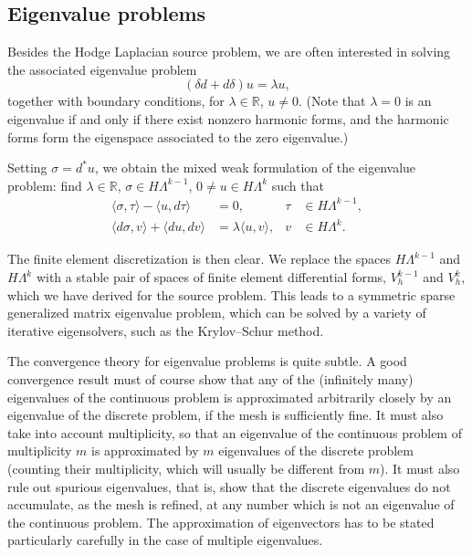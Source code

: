 \subsection{{Eigenvalue problems}}\label{sec:eigenvalue-problems}

{Besides the Hodge Laplacian source problem, we are often interested in solving the associated eigenvalue problem}
\[
(\delta d+d\delta)u=\lambda u,
\]
{together with boundary conditions, for $\lambda\in\mathbb R$, $u\neq0$. (Note that $\lambda=0$ is an eigenvalue if and only if there exist nonzero harmonic forms, and the harmonic forms form the eigenspace associated to the zero eigenvalue.)}

{Setting $\sigma=d^*u$, we obtain the mixed weak formulation of the eigenvalue problem: find $\lambda\in\mathbb R$, $\sigma\in H\Lambda^{k-1}$, $0\neq u\in H\Lambda^k$ such that}
\[
\begin{aligned}
\langle\sigma,\tau\rangle-\langle u,d\tau\rangle&=0,&\tau&\in H\Lambda^{k-1},\\
\langle d\sigma,v\rangle+\langle du,dv\rangle&=\lambda\langle u,v\rangle,&v&\in H\Lambda^k.
\end{aligned}
\]

{The finite element discretization is then clear. We replace the spaces $H\Lambda^{k-1}$ and $H\Lambda^k$ with a stable pair of spaces of finite element differential forms, $V_h^{k-1}$ and $V_h^k$, which we have derived for the source problem. This leads to a symmetric sparse generalized matrix eigenvalue problem, which can be solved by a variety of iterative eigensolvers, such as the Krylov–Schur method.}

{The convergence theory for eigenvalue problems is quite subtle. A good convergence result must of course show that any of the (infinitely many) eigenvalues of the continuous problem is approximated arbitrarily closely by an eigenvalue of the discrete problem, if the mesh is sufficiently fine. It must also take into account multiplicity, so that an eigenvalue of the continuous problem of multiplicity $m$ is approximated by $m$ eigenvalues of the discrete problem (counting their multiplicity, which will usually be different from $m$). It must also rule out spurious eigenvalues, that is, show that the discrete eigenvalues do not accumulate, as the mesh is refined, at any number which is not an eigenvalue of the continuous problem. The approximation of eigenvectors has to be stated particularly carefully in the case of multiple eigenvalues.}

